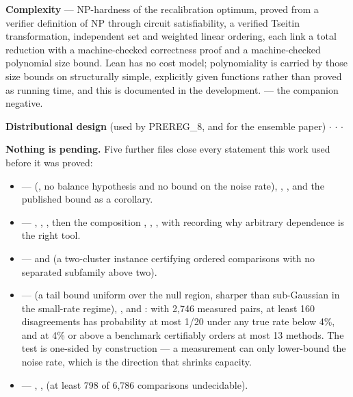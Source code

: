 \textbf{Complexity}
 --- NP-hardness of the recalibration optimum,
proved from a verifier definition of NP through circuit satisfiability, a
verified Tseitin transformation, independent set and weighted linear ordering,
each link a total reduction with a machine-checked correctness proof and a
machine-checked polynomial size bound. Lean has no cost model; polynomiality is
carried by those size bounds on structurally simple, explicitly given functions
rather than proved as running time, and this is documented in the development.
 --- the companion
negative.

\textbf{Distributional design} (used by PREREG\_8, and for the ensemble paper)
 $\cdot$
 $\cdot$  $\cdot$

\textbf{Nothing is pending.} Five further files close every statement this work used
before it was proved:

\begin{itemize}\itemsep1pt \parskip0pt
\item {} ---  (, no
  balance hypothesis and no bound on the noise rate), ,
  , and the published  bound as a corollary.
\item {} --- , ,
  , then the composition
  , ,
  , with
   recording why arbitrary
  dependence is the right tool.
\item {} ---  and
   (a two-cluster instance certifying 
  ordered comparisons with no separated subfamily above two).
\item {} ---  (a tail bound uniform over the
  null region, sharper than sub-Gaussian in the small-rate regime),
  , and : with 2,746 measured
  pairs, at least 160 disagreements has probability at most 1/20 under any true
  rate below 4\%, and at 4\% or above a benchmark certifiably orders at most 13
  methods. The test is one-sided by construction --- a measurement can only
  lower-bound the noise rate, which is the direction that shrinks capacity.
\item {} --- , ,
   (at least 798 of 6,786 comparisons undecidable).
\end{itemize}

